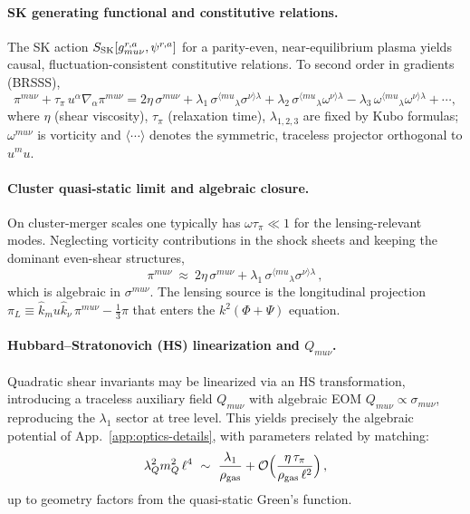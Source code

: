 \documentclass[aps,prd,onecolumn,superscriptaddress,nofootinbib]{revtex4-2}
\def\mu{mu}%
\def\alpha{alpha}%
\def\alpha_M{alphaM}%
\begin{document}
\paragraph{SK generating functional and constitutive relations.}
The SK action \(S_{\rm SK}[g_{\mu\nu}^{r,a},\psi^{r,a}]\) for a parity-even, near-equilibrium plasma yields causal, fluctuation-consistent constitutive relations. To second order in gradients (BRSSS),
\[
\pi^{\mu\nu}+\tau_\pi\,u^\alpha\nabla_\alpha \pi^{\mu\nu}
=2\eta\,\sigma^{\mu\nu}
+\lambda_1\,\sigma^{\langle\mu}{}_{\lambda}\sigma^{\nu\rangle\lambda}
+\lambda_2\,\sigma^{\langle\mu}{}_{\lambda}\omega^{\nu\rangle\lambda}
-\lambda_3\,\omega^{\langle\mu}{}_{\lambda}\omega^{\nu\rangle\lambda}
+\cdots,
\]
where \(\eta\) (shear viscosity), \(\tau_\pi\) (relaxation time), \(\lambda_{1,2,3}\) are fixed by Kubo formulas; \(\omega^{\mu\nu}\) is vorticity and \(\langle\cdots\rangle\) denotes the symmetric, traceless projector orthogonal to \(u^\mu\).

\paragraph{Cluster quasi-static limit and algebraic closure.}
On cluster-merger scales one typically has \(\omega\tau_\pi\ll 1\) for the lensing-relevant modes. Neglecting vorticity contributions in the shock sheets and keeping the dominant even-shear structures,
\[
\pi^{\mu\nu}\ \approx\ 2\eta\,\sigma^{\mu\nu}+\lambda_1\,\sigma^{\langle\mu}{}_{\lambda}\sigma^{\nu\rangle\lambda}\,,
\]
which is algebraic in \(\sigma^{\mu\nu}\). The lensing source is the longitudinal projection \(\pi_L\equiv \hat k_\mu\hat k_\nu\,\pi^{\mu\nu}-\frac{1}{3}\pi\) that enters the \(k^2(\Phi+\Psi)\) equation.

\paragraph{Hubbard–Stratonovich (HS) linearization and \(Q_{\mu\nu}\).}
Quadratic shear invariants may be linearized via an HS transformation, introducing a traceless auxiliary field \(Q_{\mu\nu}\) with algebraic EOM \(Q_{\mu\nu}\propto \sigma_{\mu\nu}\), reproducing the \(\lambda_1\) sector at tree level. This yields precisely the algebraic potential of App.~\ref{app:optics-details}, with parameters related by matching:
\[
\lambda_Q^2 m_Q^2\,\ell^4\ \sim\ \frac{\lambda_1}{\rho_{\rm gas}}+\mathcal O\Big(\frac{\eta\,\tau_\pi}{\rho_{\rm gas}\,\ell^2}\Big)\,,
\]
up to geometry factors from the quasi-static Green’s function.
\end{document}

